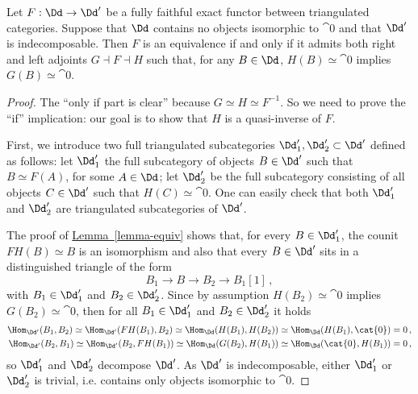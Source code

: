 \begin{prop}\label{trivial-adj-equiv}
    Let $F:\Dd \to \Dd'$ be a fully faithful exact functor
    between triangulated categories. Suppose that $\Dd$ contains no
    objects isomorphic to $\cat{0}$ and that $\Dd'$ is indecomposable.
    Then $F$ is an equivalence if and only if it admits both right 
    and left adjoints $G \dashv F \dashv H$ such that, for any $B \in \Dd$,
    $H(B) \simeq \cat{0}$ implies $G(B) \simeq \cat{0}$.
    \begin{proof}
        The ``only if part is clear'' because $G \simeq H \simeq F^{-1}$.
        So we need to prove the ``if'' implication: our goal is to show that
        $H$ is a quasi-inverse of $F$.

        First, we introduce two full triangulated subcategories
        $\Dd'_{1}, \Dd'_{2} \subset \Dd'$ defined as follows:
        let $\Dd'_{1}$ the full subcategory of objects $B \in \Dd'$
        such that $B \simeq F(A)$, for some $A \in \Dd$; 
        let $\Dd'_{2}$ be the full subcategory consisting of
        all objects $C \in \Dd'$ such that $H(C) \simeq \cat{0}$.
        One can easily check that both $\Dd'_{1}$ and $\Dd'_{2}$
        are triangulated subcategories of $\Dd'$.

        The proof of \hyperref[lemma-equiv]{Lemma~\ref*{lemma-equiv}}
        shows that, for every $B \in \Dd'_{1}$, the counit $FH(B) \simeq B$
        is an isomorphism and also that every $B \in \Dd'$
        sits in a distinguished triangle of the form
        \begin{equation*}
            B_{1} \longrightarrow
            B \longrightarrow
            B_{2} \longrightarrow
            B_{1}{[1]}\,,
        \end{equation*}
        with $B_{1} \in \Dd'_{1}$ and $B_{2} \in \Dd'_{2}$.
        Since by assumption $H(B_{2}) \simeq \cat{0}$
        implies $G(B_{2}) \simeq \cat{0}$,
        then for all $B_{1} \in \Dd'_{1}$ and $B_{2} \in \Dd'_{2}$
        it holds
        \begin{align*}
            \Hom_{\Dd'}(B_{1}, B_{2})
            \simeq \Hom_{\Dd'}(FH(B_{1}),B_{2}) 
            \simeq \Hom_{\Dd}(H(B_{1}),H(B_{2})) 
            \simeq \Hom_{\Dd}(H(B_{1}),\cat{0}) = 0\,, \\
            \Hom_{\Dd'}(B_{2}, B_{1})
            \simeq \Hom_{\Dd'}(B_{2}, FH(B_{1})) 
            \simeq \Hom_{\Dd}(G(B_{2}),H(B_{1})) 
            \simeq \Hom_{\Dd}(\cat{0}, H(B_{1}))= 0\,,
        \end{align*}
        so $\Dd'_{1}$ and $\Dd'_{2}$ decompose $\Dd'$.
        As $\Dd'$ is indecomposable, either $\Dd'_{1}$
        or $\Dd'_{2}$ is trivial, i.e. contains only objects
        isomorphic to $\cat{0}$.


\end{proof}
\end{prop}
